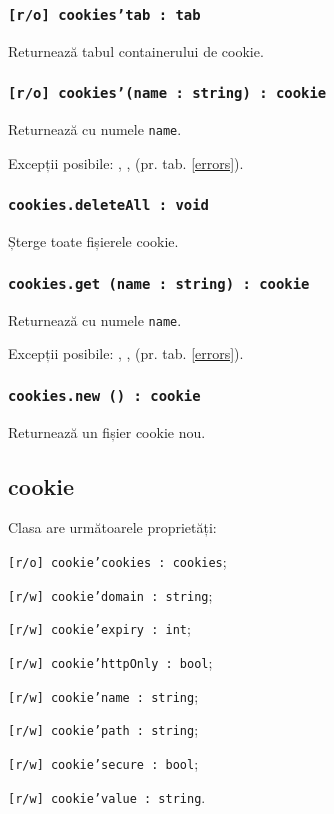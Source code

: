 \subsubsection{\texttt{[r/o] cookies'tab : tab}}

Returnează tabul containerului de cookie.

\subsubsection{\texttt{[r/o] cookies'(name : string) : cookie}}

Returnează \cookie{} cu numele \texttt{name}.

Excepții posibile: , ,  (pr. tab. \ref{errors}).

\subsubsection{\texttt{cookies.deleteAll : void}}

Șterge toate fișierele cookie.

\subsubsection{\texttt{cookies.get (name : string) : cookie}}

Returnează \cookie{} cu numele \texttt{name}.

Excepții posibile: , ,  (pr. tab. \ref{errors}).

\subsubsection{\texttt{cookies.new () : cookie}}

Returnează un fișier cookie nou.

\subsection{cookie}

Clasa \cookie{} are următoarele proprietăți:
\begin{icItems}
	\item \texttt{[r/o] cookie'cookies : cookies};
	\item \texttt{[r/w] cookie'domain : string};
	\item \texttt{[r/w] cookie'expiry : int};
	\item \texttt{[r/w] cookie'httpOnly : bool};
	\item \texttt{[r/w] cookie'name : string};
	\item \texttt{[r/w] cookie'path : string};
	\item \texttt{[r/w] cookie'secure : bool};
	\item \texttt{[r/w] cookie'value : string}.
\end{icItems}

